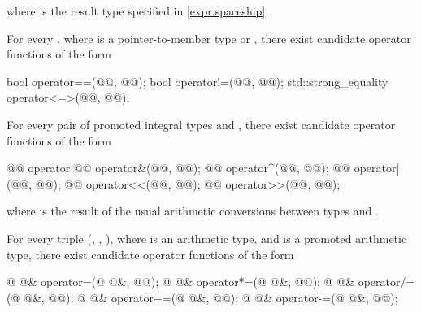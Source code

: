 where  is the result type specified in \ref{expr.spaceship}.

\pnum
For every , where 
is a pointer-to-member type or ,
there exist candidate operator functions of the form

\begin{codeblock}
bool                 operator==(@@, @@);
bool                 operator!=(@@, @@);
std::strong_equality operator<=>(@@, @@);
\end{codeblock}

\pnum
For every pair of promoted integral types
and
,
there exist candidate operator functions of the form

\begin{codeblock}
@@      operator%
@@      operator&(@@, @@);
@@      operator^(@@, @@);
@@      operator|(@@, @@);
@@       operator<<(@@, @@);
@@       operator>>(@@, @@);
\end{codeblock}

where
is the result of the usual arithmetic conversions between types
and
.

\pnum
For every triple
(,
,
),
where
is an arithmetic type,
and
is a promoted arithmetic type,
there exist candidate operator functions of the form

\begin{codeblock}
@ @&   operator=(@ @&, @@);
@ @&   operator*=(@ @&, @@);
@ @&   operator/=(@ @&, @@);
@ @&   operator+=(@ @&, @@);
@ @&   operator-=(@ @&, @@);
\end{codeblock}

